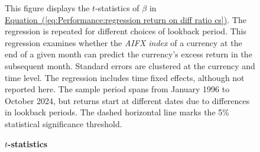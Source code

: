 \documentclass[12pt,oneside,letter]{article}
\newcommand*{\myeq}[1]{\hyperref[{#1}]{Equation~(\ref*{#1})}}
\begin{document}
\begin{landscape}
	
	\begin{figure}

	    \begin{center}
	    	\caption{\bf $t$-statistics}
		    \medskip
		     \label{fig:Performance:t-stat for regression of return on diff ratio CS}
	    \end{center}
	
	
	    \begin{small}
	    This figure displays the $t$-statistics of $\beta$ in \myeq{eq:Performance:regression return on diff ratio cs}. The regression is repeated for different choices of lookback period. This regression examines whether the \textit{AIFX index} of a currency at the end of a given month can predict the currency's excess return in the subsequent month. Standard errors are clustered at the currency and time level. The regression includes time fixed effects, although not reported here. The sample period spans from January 1996 to October 2024, but returns start at different dates due to differences in lookback periods. The dashed horizontal line marks the 5\% statistical significance threshold. 
	
	
	    \end{small}


	\end{figure}

\end{landscape}
\end{document}
